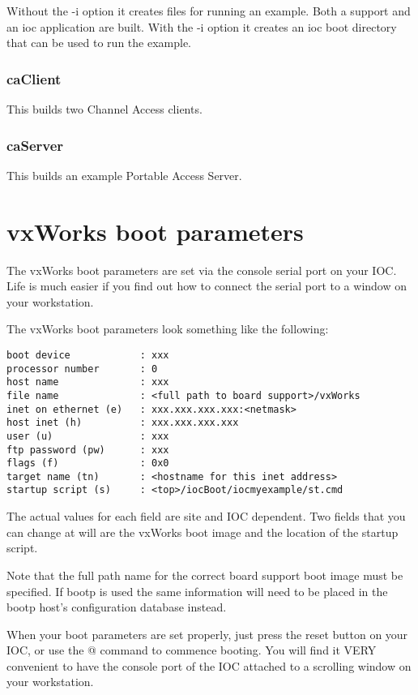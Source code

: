 Without the -i option it creates files for running an example. Both a support and an ioc application are built. With the -i 
option it creates an ioc boot directory that can be used to run the example.

\subsubsection{caClient}

This builds two Channel Access clients.

\subsubsection{caServer}

This builds an example Portable Access Server.

\section{vxWorks boot parameters}

The vxWorks boot parameters are set via the console serial port on your IOC. Life is much easier if you find out how to 
connect the serial port to a window on your workstation.

The vxWorks boot parameters look something like the following:

\begin{verbatim}boot device            : xxx
processor number       : 0
host name              : xxx
file name              : <full path to board support>/vxWorks
inet on ethernet (e)   : xxx.xxx.xxx.xxx:<netmask>
host inet (h)          : xxx.xxx.xxx.xxx
user (u)               : xxx
ftp password (pw)      : xxx
flags (f)              : 0x0
target name (tn)       : <hostname for this inet address>
startup script (s)     : <top>/iocBoot/iocmyexample/st.cmd
\end{verbatim}The actual values for each field are site and IOC dependent. Two fields that you can change at will are the vxWorks boot 
image and the location of the startup script.

Note that the full path name for the correct board support boot image must be specified. If bootp is used the same 
information will need to be placed in the bootp host's configuration database instead.

When your boot parameters are set properly, just press the reset button on your IOC, or use the @ command to commence 
booting. You will find it VERY convenient to have the console port of the IOC attached to a scrolling window on your 
workstation.

